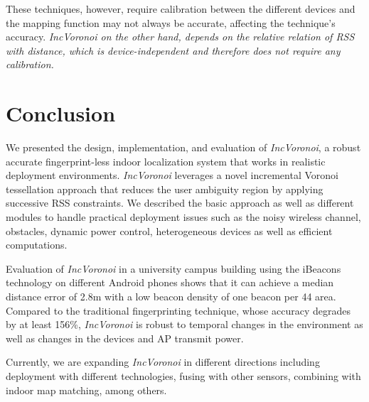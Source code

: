 \documentclass[conference]{IEEEtran}
\def \sys {\textit{IncVoronoi}}
\begin{document}
These techniques, however, require calibration between the different devices and the mapping function may not always be accurate, affecting the technique's accuracy. \emph{\sys{} on the other hand, depends on the relative relation of RSS with distance, which is device-independent and therefore does not require any calibration.
}

\section{Conclusion}
\label{sec:conclude}
We presented the design, implementation, and evaluation of \sys{}, a robust  accurate fingerprint-less indoor localization system that works in realistic deployment environments. \sys{} leverages a novel incremental Voronoi tessellation approach that reduces the user ambiguity region by applying successive RSS constraints.  We described the basic approach as well as different modules to handle practical deployment issues such as the noisy wireless channel, obstacles, dynamic power control, heterogeneous devices 
as well as efficient computations.

  Evaluation of \sys{} in a university campus building using the iBeacons technology on different Android phones shows that it can achieve a median distance error of 2.8m with a low beacon density of one beacon per 44 area. Compared to the traditional fingerprinting technique, whose accuracy degrades by at least 156\%,  \sys{} is robust to temporal changes in the environment as well as changes in the devices and AP transmit power. 

  Currently, we are expanding \sys{} in different directions including deployment with different technologies, fusing with other sensors, combining with indoor map matching, among others.
\end{document}
